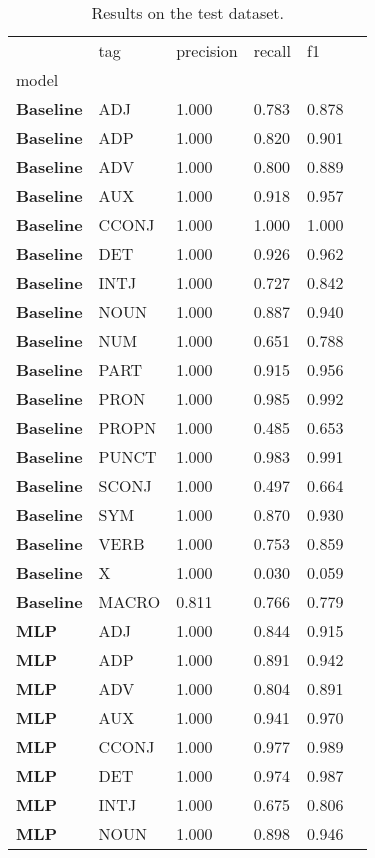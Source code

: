 \begin{table}
\caption{Results on the test dataset.}
\label{tab::ex_10_test}
\begin{tabular}{|l|l|l|l|l|l|}
\toprule
 & tag & precision & recall & f1 \\
model &  &  &  &  \\
\midrule
\textbf{Baseline} & ADJ & 1.000 & 0.783 & 0.878 \\
\textbf{Baseline} & ADP & 1.000 & 0.820 & 0.901 \\
\textbf{Baseline} & ADV & 1.000 & 0.800 & 0.889 \\
\textbf{Baseline} & AUX & 1.000 & 0.918 & 0.957 \\
\textbf{Baseline} & CCONJ & 1.000 & 1.000 & 1.000 \\
\textbf{Baseline} & DET & 1.000 & 0.926 & 0.962 \\
\textbf{Baseline} & INTJ & 1.000 & 0.727 & 0.842 \\
\textbf{Baseline} & NOUN & 1.000 & 0.887 & 0.940 \\
\textbf{Baseline} & NUM & 1.000 & 0.651 & 0.788 \\
\textbf{Baseline} & PART & 1.000 & 0.915 & 0.956 \\
\textbf{Baseline} & PRON & 1.000 & 0.985 & 0.992 \\
\textbf{Baseline} & PROPN & 1.000 & 0.485 & 0.653 \\
\textbf{Baseline} & PUNCT & 1.000 & 0.983 & 0.991 \\
\textbf{Baseline} & SCONJ & 1.000 & 0.497 & 0.664 \\
\textbf{Baseline} & SYM & 1.000 & 0.870 & 0.930 \\
\textbf{Baseline} & VERB & 1.000 & 0.753 & 0.859 \\
\textbf{Baseline} & X & 1.000 & 0.030 & 0.059 \\
\textbf{Baseline} & MACRO & 0.811 & 0.766 & 0.779 \\
\textbf{MLP} & ADJ & 1.000 & 0.844 & 0.915 \\
\textbf{MLP} & ADP & 1.000 & 0.891 & 0.942 \\
\textbf{MLP} & ADV & 1.000 & 0.804 & 0.891 \\
\textbf{MLP} & AUX & 1.000 & 0.941 & 0.970 \\
\textbf{MLP} & CCONJ & 1.000 & 0.977 & 0.989 \\
\textbf{MLP} & DET & 1.000 & 0.974 & 0.987 \\
\textbf{MLP} & INTJ & 1.000 & 0.675 & 0.806 \\
\textbf{MLP} & NOUN & 1.000 & 0.898 & 0.946 \\

\end{tabular}
\end{table}
